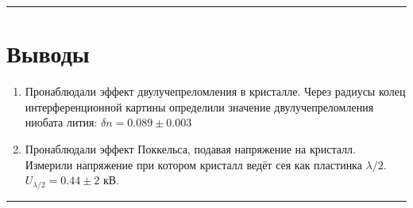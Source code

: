 \documentclass[a4paper,12pt]{article} %
\begin{document}
\medskip\hrule\medskip

\section{Выводы}

\begin{enumerate}
\item Пронаблюдали эффект двулучепреломления в кристалле. Через радиусы колец интерференционной картины определили значение двулучепреломления ниобата лития: $\delta n = 0.089 \pm 0.003$
\item Пронаблюдали эффект Поккельса, подавая напряжение на кристалл. Измерили напряжение при котором кристалл ведёт сея как пластинка $\lambda /2$. $U_{\lambda / 2} = 0.44 \pm 2$ кВ.
\end{enumerate}

\medskip\hrule\medskip
\end{document}
